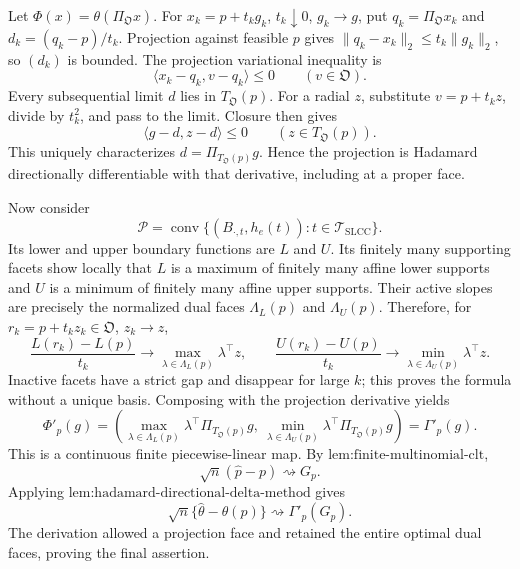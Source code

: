 Let \(\Phi(x)=\theta(\Pi_{\mathfrak O}x)\).  For \(x_k=p+t_kg_k\), \(t_k\downarrow0\), \(g_k\to g\), put \(q_k=\Pi_{\mathfrak O}x_k\) and \(d_k=(q_k-p)/t_k\).  Projection against feasible \(p\) gives \(\|q_k-x_k\|_2\leq t_k\|g_k\|_2\), so \((d_k)\) is bounded.  The projection variational inequality is
\[
\langle x_k-q_k,v-q_k\rangle\leq0\qquad(v\in\mathfrak O).
\]
Every subsequential limit \(d\) lies in \(T_{\mathfrak O}(p)\).  For a radial \(z\), substitute \(v=p+t_kz\), divide by \(t_k^2\), and pass to the limit.  Closure then gives
\[
\langle g-d,z-d\rangle\leq0\qquad(z\in T_{\mathfrak O}(p)).
\]
This uniquely characterizes \(d=\Pi_{T_{\mathfrak O}(p)}g\).  Hence the projection is Hadamard directionally differentiable with that derivative, including at a proper face.

Now consider
\[
\mathcal P=\operatorname{conv}\{(B_{\cdot,t},h_e(t)):t\in\mathcal T_{\mathrm{SLCC}}\}.
\]
Its lower and upper boundary functions are \(L\) and \(U\).  Its finitely many supporting facets show locally that \(L\) is a maximum of finitely many affine lower supports and \(U\) is a minimum of finitely many affine upper supports.  Their active slopes are precisely the normalized dual faces \(\Lambda_L(p)\) and \(\Lambda_U(p)\).  Therefore, for \(r_k=p+t_kz_k\in\mathfrak O\), \(z_k\to z\),
\[
\frac{L(r_k)-L(p)}{t_k}\to\max_{\lambda\in\Lambda_L(p)}\lambda^{\top}z,\qquad
\frac{U(r_k)-U(p)}{t_k}\to\min_{\lambda\in\Lambda_U(p)}\lambda^{\top}z.
\]
Inactive facets have a strict gap and disappear for large \(k\); this proves the formula without a unique basis.  Composing with the projection derivative yields
\[
\Phi'_p(g)=
\left(
\max_{\lambda\in\Lambda_L(p)}\lambda^{\top}\Pi_{T_{\mathfrak O}(p)}g,\
\min_{\lambda\in\Lambda_U(p)}\lambda^{\top}\Pi_{T_{\mathfrak O}(p)}g
\right)=\Gamma'_p(g).
\]
This is a continuous finite piecewise-linear map.  By \(\text{lem:finite-multinomial-clt}\),
\[
\sqrt n(\widehat p-p)\rightsquigarrow G_p.
\]
Applying \(\text{lem:hadamard-directional-delta-method}\) gives
\[
\sqrt n\{\widehat\theta-\theta(p)\}\rightsquigarrow\Gamma'_p(G_p).
\]
The derivation allowed a projection face and retained the entire optimal dual faces, proving the final assertion.